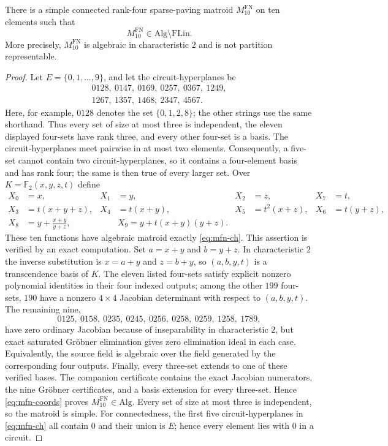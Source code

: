 \documentclass[11pt]{article}
\theoremstyle{definition}
\newcommand{\FLin}{\mathrm{FLin}}
\newcommand{\Alg}{\mathrm{Alg}}
\begin{document}
\begin{proposition}\label{prop:mfn10}
There is a simple connected rank-four sparse-paving matroid $M^{\mathrm{FN}}_{10}$ on ten elements such that
\[
M^{\mathrm{FN}}_{10}\in\Alg\setminus\FLin.
\]
More precisely, $M^{\mathrm{FN}}_{10}$ is algebraic in characteristic $2$ and is not partition representable.
\end{proposition}
\begin{proof}
Let $E=\{0,1,\ldots,9\}$, and let the circuit-hyperplanes be
\begin{equation}\label{eq:mfn-ch}
\begin{gathered}
0128,\ 0147,\ 0169,\ 0257,\ 0367,\ 1249,\\
1267,\ 1357,\ 1468,\ 2347,\ 4567.
\end{gathered}
\end{equation}
Here, for example, $0128$ denotes the set $\{0,1,2,8\}$; the other strings use the same shorthand.
Thus every set of size at most three is independent, the eleven displayed four-sets have rank three, and every other four-set is a basis.  The circuit-hyperplanes meet pairwise in at most two elements.  Consequently, a five-set cannot contain two circuit-hyperplanes, so it contains a four-element basis and has rank four; the same is then true of every larger set.  Over $K=\mathbb F_2(x,y,z,t)$ define
\begin{equation}\label{eq:mfn-coords}
\begin{aligned}
X_0&=x,&X_1&=y,&X_2&=z,&X_7&=t,\\
X_3&=t(x+y+z),&X_4&=t(x+y),&X_5&=t^2(x+z),&X_6&=t(y+z),\\
X_8&=y+\frac{x+y}{y+z},&&
X_9=y+t(x+y)(y+z).&&
\end{aligned}
\end{equation}
These ten functions have algebraic matroid exactly \eqref{eq:mfn-ch}.  This assertion is verified by an exact computation.  Set $a=x+y$ and $b=y+z$.  In characteristic $2$ the inverse substitution is $x=a+y$ and $z=b+y$, so $(a,b,y,t)$ is a transcendence basis of $K$.  The eleven listed four-sets satisfy explicit nonzero polynomial identities in their four indexed outputs; among the other $199$ four-sets, $190$ have a nonzero $4\times4$ Jacobian determinant with respect to $(a,b,y,t)$.  The remaining nine,
\[
0125,\ 0158,\ 0235,\ 0245,\ 0256,\ 0258,\ 0259,\ 1258,\ 1789,
\]
have zero ordinary Jacobian because of inseparability in characteristic $2$, but exact saturated Gr\"obner elimination gives zero elimination ideal in each case.  Equivalently, the source field is algebraic over the field generated by the corresponding four outputs.  Finally, every three-set extends to one of these verified bases.  The companion certificate contains the exact Jacobian numerators, the nine Gr\"obner certificates, and a basis extension for every three-set.  Hence \eqref{eq:mfn-coords} proves $M^{\mathrm{FN}}_{10}\in\Alg$.  Every set of size at most three is independent, so the matroid is simple.  For connectedness, the first five circuit-hyperplanes in \eqref{eq:mfn-ch} all contain $0$ and their union is $E$; hence every element lies with $0$ in a circuit.


\end{proof}
\end{document}
